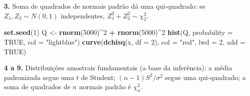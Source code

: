 \documentclass[
  portuguese,
  11pt,
  openany]{book}
\newenvironment{Shaded}{\begin{snugshade}}{\end{snugshade}}
\newcommand{\AttributeTok}[1]{\textcolor[rgb]{0.13,0.29,0.53}{#1}}
\newcommand{\ConstantTok}[1]{\textcolor[rgb]{0.56,0.35,0.01}{#1}}
\newcommand{\DecValTok}[1]{\textcolor[rgb]{0.00,0.00,0.81}{#1}}
\newcommand{\FunctionTok}[1]{\textcolor[rgb]{0.13,0.29,0.53}{\textbf{#1}}}
\newcommand{\NormalTok}[1]{#1}
\newcommand{\OtherTok}[1]{\textcolor[rgb]{0.56,0.35,0.01}{#1}}
\newcommand{\SpecialCharTok}[1]{\textcolor[rgb]{0.81,0.36,0.00}{\textbf{#1}}}
\newcommand{\StringTok}[1]{\textcolor[rgb]{0.31,0.60,0.02}{#1}}
\begin{document}
\textbf{3.} Soma de quadrados de normais padrão dá uma qui-quadrado: se \(Z_1, Z_2 \sim
N(0,1)\) independentes, \(Z_1^2 + Z_2^2 \sim \chi^2_2\).

\begin{Shaded}
\begin{Highlighting}[]
\FunctionTok{set.seed}\NormalTok{(}\DecValTok{1}\NormalTok{)}
\NormalTok{Q }\OtherTok{\textless{}{-}} \FunctionTok{rnorm}\NormalTok{(}\DecValTok{5000}\NormalTok{)}\SpecialCharTok{\^{}}\DecValTok{2} \SpecialCharTok{+} \FunctionTok{rnorm}\NormalTok{(}\DecValTok{5000}\NormalTok{)}\SpecialCharTok{\^{}}\DecValTok{2}
\FunctionTok{hist}\NormalTok{(Q, }\AttributeTok{probability =} \ConstantTok{TRUE}\NormalTok{, }\AttributeTok{col =} \StringTok{"lightblue"}\NormalTok{)}
\FunctionTok{curve}\NormalTok{(}\FunctionTok{dchisq}\NormalTok{(x, }\AttributeTok{df =} \DecValTok{2}\NormalTok{), }\AttributeTok{col =} \StringTok{"red"}\NormalTok{, }\AttributeTok{lwd =} \DecValTok{2}\NormalTok{, }\AttributeTok{add =} \ConstantTok{TRUE}\NormalTok{)}
\end{Highlighting}
\end{Shaded}

\textbf{4 a 9.} Distribuições amostrais fundamentais (a base da inferência): a média
padronizada segue uma \(t\) de Student; \((n-1)S^2/\sigma^2\) segue uma
qui-quadrado; a soma de quadrados de \(n\) normais padrão é \(\chi^2_n\).
\end{document}
